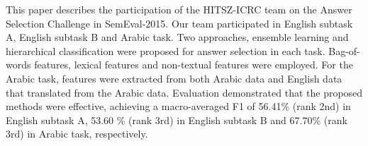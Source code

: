 This paper describes the participation of the HITSZ-ICRC team on the Answer Selection Challenge in SemEval-2015. Our team participated in English subtask A, English subtask B and Arabic task. Two approaches, ensemble learning and hierarchical classification were proposed for answer selection in each task. Bag-of-words features, lexical features and non-textual features were employed. For the Arabic task, features were extracted from both Arabic data and English data that translated from the Arabic data. Evaluation demonstrated that the proposed methods were effective, achieving a macro-averaged F1 of 56.41\% (rank 2nd) in English subtask A, 53.60 \% (rank 3rd) in English subtask B and 67.70\% (rank 3rd) in Arabic task, respectively.
